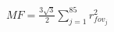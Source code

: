 \documentclass[convert={convertexe={magick.exe}}]{standalone}
\begin{document}
$MF = \frac{3\sqrt{3}}{2} \sum_{j=1}^{85} r_{fov_j}^2$
\end{document}
